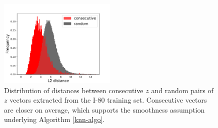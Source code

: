 \documentclass{article}
\begin{document}
\begin{figure}
  \centering
  \includegraphics[width=0.5\textwidth]{images/distance_histograms.pdf}
  \caption{Distribution of distances between consecutive $z$ and random pairs of $z$ vectors extracted from the I-80 training set. Consecutive vectors are closer on average, which supports the smoothness assumption underlying Algorithm \ref{knn-algo}.}
\end{figure}



%




%
%
\end{document}

